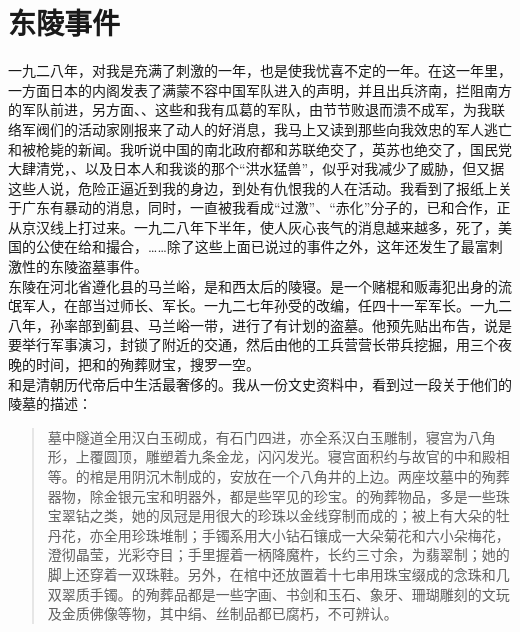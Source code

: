\fancyhead[RO]{} %
\fancyhead[LE]{} %
\chapter*{东陵事件}
\thispagestyle{empty}
一九二八年，对我是充满了刺激的一年，也是使我忧喜不定的一年。在这一年里，一方面日本的内阁发表了满蒙不容中国军队进入的声明，并且出兵济南，拦阻南方的军队前进，另方面、、这些和我有瓜葛的军队，由节节败退而溃不成军，为我联络军阀们的活动家刚报来了动人的好消息，我马上又读到那些向我效忠的军人逃亡和被枪毙的新闻。我听说中国的南北政府都和苏联绝交了，英苏也绝交了，国民党大肆清党，、以及日本人和我谈的那个“洪水猛兽”，似乎对我减少了威胁，但又据这些人说，危险正逼近到我的身边，到处有仇恨我的人在活动。我看到了报纸上关于广东有暴动的消息，同时，一直被我看成“过激”、“赤化”分子的，已和合作，正从京汉线上打过来。一九二八年下半年，使人灰心丧气的消息越来越多，死了，美国的公使在给和撮合，……除了这些上面已说过的事件之外，这年还发生了最富刺激性的东陵盗墓事件。\\

东陵在河北省遵化县的马兰峪，是和西太后的陵寝。是一个赌棍和贩毒犯出身的流氓军人，在部当过师长、军长。一九二七年孙受的改编，任四十一军军长。一九二八年，孙率部到蓟县、马兰峪一带，进行了有计划的盗墓。他预先贴出布告，说是要举行军事演习，封锁了附近的交通，然后由他的工兵营营长带兵挖掘，用三个夜晚的时间，把和的殉葬财宝，搜罗一空。\\

和是清朝历代帝后中生活最奢侈的。我从一份文史资料中，看到过一段关于他们的陵墓的描述：\\

\begin{quote}
	墓中隧道全用汉白玉砌成，有石门四进，亦全系汉白玉雕制，寝宫为八角形，上覆圆顶，雕塑着九条金龙，闪闪发光。寝宫面积约与故官的中和殿相等。的棺是用阴沉木制成的，安放在一个八角井的上边。两座坟墓中的殉葬器物，除金银元宝和明器外，都是些罕见的珍宝。的殉葬物品，多是一些珠宝翠钻之类，她的凤冠是用很大的珍珠以金线穿制而成的；被上有大朵的牡丹花，亦全用珍珠堆制；手镯系用大小钻石镶成一大朵菊花和六小朵梅花，澄彻晶莹，光彩夺目；手里握着一柄降魔杵，长约三寸余，为翡翠制；她的脚上还穿着一双珠鞋。另外，在棺中还放置着十七串用珠宝缀成的念珠和几双翠质手镯。的殉葬品都是一些字画、书剑和玉石、象牙、珊瑚雕刻的文玩及金质佛像等物，其中绢、丝制品都已腐朽，不可辨认。\\
\end{quote}

